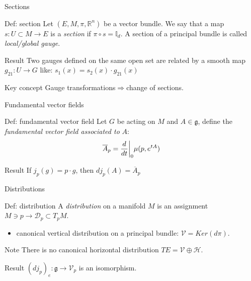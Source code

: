 \documentclass{beamer}
\begin{document}
\begin{frame}{Sections}
	\begin{exampleblock}{Def: section}
			Let $(E,M,\pi,\mathbb{R}^n)$ be a vector bundle. We say that a map \\$s:U\subset M\rightarrow E$ is a \textit{section} if $\pi\circ s=\mathbb{I}_d$. A section of a principal bundle is called \textit{local/global gauge}.
	\end{exampleblock}
	\begin{block}{Result}
		Two gauges defined on the same open set are related by a smooth map $g_{21}:U\rightarrow G$ like: $s_1(x)=s_2(x)\cdot g_{21}(x)$
	\end{block}
	\begin{alertblock}{Key concept}
		Gauge transformations$\Longrightarrow$change of sections.
	\end{alertblock}
\end{frame}
\begin{frame}{Fundamental vector fields}
	\begin{exampleblock}{Def: fundamental vector field}
		Let $G$ be acting on $M$ and $A\in\mathfrak{g}$, define the \textit{fundamental vector field associated to} $A$:
		$$\overline{A}_p={d\over dt}\bigg|_0 \mu(p,e^{tA})$$
	\end{exampleblock}
	\begin{block}{Result}
		If $j_p(g)=p\cdot g$, then $dj_p(A)=\overline{A}_p$
	\end{block}
\end{frame}
\begin{frame}{Distributions}
	\begin{exampleblock}{Def: distribution}
			A \textit{distribution} on a manifold $M$ is an assignment $M\ni p\rightarrow \mathcal{D}_p\subset T_pM$.
			\begin{itemize}
				\item canonical vertical distribution on a principal bundle: $\mathcal{V}=Ker(d\pi)$.
			\end{itemize}
	\end{exampleblock}
	\begin{alertblock}{Note}
		There is no canonical horizontal distribution $TE=\mathcal{V}\oplus\mathcal{H}$.
	\end{alertblock}
	\begin{block}{Result}
		$(dj_p)_e:\mathfrak{g}\rightarrow \mathcal{V}_p$ is an isomorphism.
	\end{block}
\end{frame}
\end{document}
